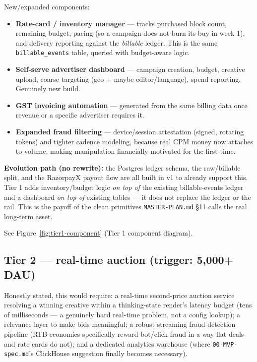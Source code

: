 New/expanded components:

\begin{itemize}
  \item \textbf{Rate-card / inventory manager} --- tracks purchased block count, remaining budget, pacing (so a campaign does not burn its buy in week 1), and delivery reporting against the \textit{billable} ledger. This is the same \texttt{billable\_events} table, queried with budget-aware logic.
  \item \textbf{Self-serve advertiser dashboard} --- campaign creation, budget, creative upload, coarse targeting (geo + maybe editor/language), spend reporting. Genuinely new build.
  \item \textbf{GST invoicing automation} --- generated from the same billing data once revenue or a specific advertiser requires it.
  \item \textbf{Expanded fraud filtering} --- device/session attestation (signed, rotating tokens) and tighter cadence modeling, because real CPM money now attaches to volume, making manipulation financially motivated for the first time.
\end{itemize}

\textbf{Evolution path (no rewrite):} the Postgres ledger schema, the raw/billable split, and the RazorpayX payout flow are all built in v1 to already support this. Tier 1 adds inventory/budget logic \textit{on top of} the existing billable-events ledger and a dashboard \textit{on top of} existing tables --- it does not replace the ledger or the rail. This is the payoff of the clean primitives \texttt{MASTER-PLAN.md} \S11 calls the real long-term asset.

See Figure~\ref{fig:tier1-component} (Tier 1 component diagram).

\subsection{Tier 2 --- real-time auction (trigger: 5,000+ DAU)}
\label{sec:tier2}

Honestly stated, this would require: a real-time second-price auction service resolving a winning creative within a thinking-state render's latency budget (tens of milliseconds --- a genuinely hard real-time problem, not a config lookup); a relevance layer to make bids meaningful; a robust streaming fraud-detection pipeline (RTB economics specifically reward bot/click fraud in a way flat deals and rate cards do not); and a dedicated analytics warehouse (where \texttt{00-MVP-spec.md}'s ClickHouse suggestion finally becomes necessary).

